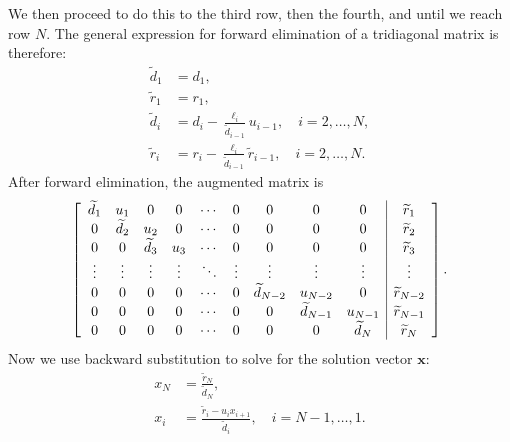 We then proceed to do this to the third row, then the fourth, and until we reach row $N$. The general expression for forward elimination of a tridiagonal matrix is therefore:
\begin{subequations}
\begin{align}
  \widetilde{d}_1 &= d_1, \\
  \widetilde{r}_1 &= r_1, \\
  \widetilde{d}_i &= d_i - \frac{\ell_i}{\widetilde{d}_{i-1}} u_{i-1}, \quad i = 2, \ldots, N, \\
  \widetilde{r}_i &= r_i - \frac{\ell_i}{\widetilde{d}_{i-1}} \widetilde{r}_{i-1}, \quad i = 2, \ldots, N.
\end{align}
\end{subequations}
After forward elimination, the augmented matrix is
\begin{align}
  \left[ \begin{array}{c c c c c c c c c | c} 
  \widetilde{d}_{1}    & u_{1}    & 0      & 0      & \cdots & 0          & 0          & 0        & 0       & \widetilde{r}_1	  \\
  0		   & \widetilde{d}_{2}    & u_{2}  & 0      & \cdots & 0          & 0          & 0        & 0       & \widetilde{r}_2	  \\
  0        & 0 & \widetilde{d}_{3}  & u_{3}  & \cdots & 0          & 0          & 0        & 0       		& \widetilde{r}_3	  \\
  \vdots   & \vdots   & \vdots & \vdots & \ddots & \vdots     & \vdots     & \vdots   & \vdots  & \vdots  \\
  0        & 0        & 0      & 0      & \cdots & 0 & \widetilde{d}_{N-2}    & u_{N-2}  & 0       & \widetilde{r}_{N-2} \\
  0        & 0        & 0      & 0      & \cdots & 0		  & 0 & \widetilde{d}_{N-1}  & u_{N-1} & \widetilde{r}_{N-1} \\ 
  0        & 0        & 0      & 0      & \cdots & 0          & 0          & 0 & \widetilde{d}_{N}   & \widetilde{r}_N     \\ 
  \end{array} \right] .  \nonumber
\end{align}
Now we use backward substitution to solve for the solution vector $\mathbf{x}$:
\begin{subequations}
\begin{align}
  x_N &= \frac{\widetilde{r}_N}{\widetilde{d}_N}, \\
  x_i &= \frac{\widetilde{r}_i - u_i x_{i+1} }{\widetilde{d}_i}, \quad i = N-1, \ldots, 1.
\end{align}
\end{subequations}

